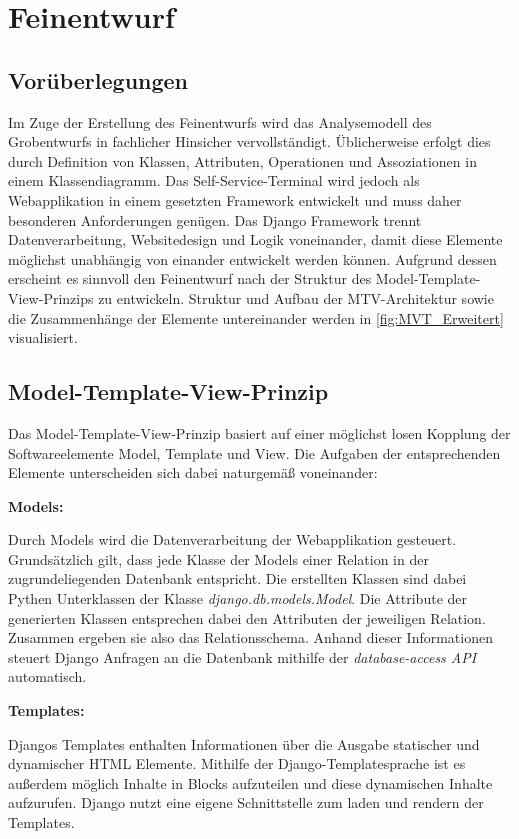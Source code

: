 \section{Feinentwurf}
\subsection{Vorüberlegungen}
Im Zuge der Erstellung des Feinentwurfs wird das Analysemodell des Grobentwurfs in fachlicher Hinsicher vervollständigt. Üblicherweise erfolgt dies durch Definition von Klassen, Attributen, Operationen und Assoziationen in einem Klassendiagramm. Das Self-Service-Terminal wird jedoch als Webapplikation in einem gesetzten Framework entwickelt und muss daher besonderen Anforderungen genügen.
Das Django Framework trennt Datenverarbeitung, Websitedesign und Logik voneinander, damit diese Elemente möglichst unabhängig von einander entwickelt werden können. Aufgrund dessen erscheint es sinnvoll den Feinentwurf nach der Struktur des Model-Template-View-Prinzips zu entwickeln. Struktur und Aufbau der MTV-Architektur sowie die Zusammenhänge der Elemente untereinander werden in \ref{fig:MVT_Erweitert} visualisiert.

\subsection{Model-Template-View-Prinzip}
Das Model-Template-View-Prinzip basiert auf einer möglichst losen Kopplung der Softwareelemente Model, Template und View. Die Aufgaben der entsprechenden Elemente unterscheiden sich dabei naturgemäß voneinander:\par 
\vspace{0,5cm}
\noindent \textbf{Models:} \par
\vspace{0,5cm}
\noindent Durch Models wird die Datenverarbeitung der Webapplikation gesteuert. Grundsätzlich gilt, dass jede Klasse der Models einer Relation in der zugrundeliegenden Datenbank entspricht. Die erstellten Klassen sind dabei Pythen Unterklassen der Klasse \textit{django.db.models.Model}. Die Attribute der generierten Klassen entsprechen dabei den Attributen der jeweiligen Relation. Zusammen ergeben sie also das Relationsschema. Anhand dieser Informationen steuert Django Anfragen an die Datenbank mithilfe der \textit{database-access API} automatisch.\par
\vspace{0,5cm}
\noindent \textbf{Templates:}\par
\vspace{0,5cm}
\noindent Djangos Templates enthalten Informationen über die Ausgabe statischer und dynamischer HTML Elemente. Mithilfe der Django-Templatesprache ist es außerdem möglich Inhalte in Blocks aufzuteilen und diese dynamischen Inhalte aufzurufen. Django nutzt eine eigene Schnittstelle zum laden und rendern der Templates.

